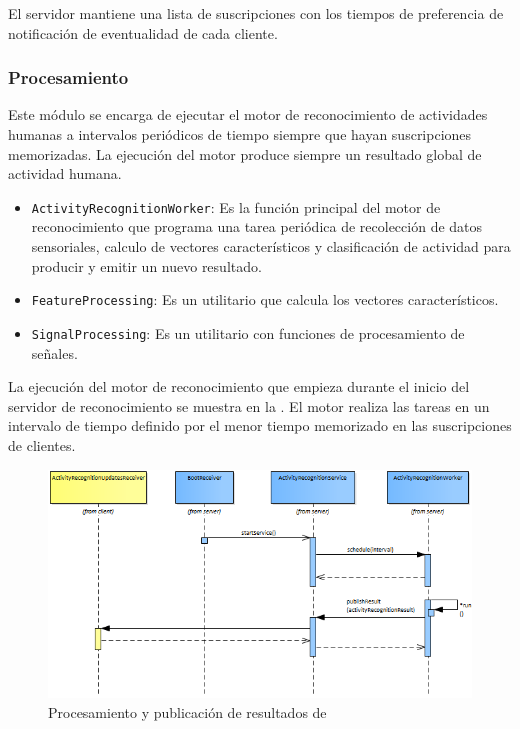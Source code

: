El servidor mantiene una lista de suscripciones con los tiempos de
preferencia de notificación de eventualidad de cada cliente. 

\subsubsection{Procesamiento}

Este módulo se encarga de ejecutar el motor de reconocimiento de actividades
humanas a intervalos periódicos de tiempo siempre que hayan suscripciones
memorizadas. La ejecución del motor produce siempre un resultado global
de actividad humana.
\begin{itemize}
\item \texttt{\small{}ActivityRecognitionWorker}: Es la función principal
del motor de reconocimiento que programa una tarea periódica de recolección
de datos sensoriales, calculo de vectores característicos y clasificación
de actividad para producir y emitir un nuevo resultado.
\item \texttt{\small{}FeatureProcessing}: Es un utilitario que calcula los
vectores característicos.
\item \texttt{\small{}SignalProcessing}: Es un utilitario con funciones
de procesamiento de señales. 
\end{itemize}
La ejecución del motor de reconocimiento que empieza durante el inicio
del servidor de reconocimiento se muestra en la .
El motor realiza las tareas en un intervalo de tiempo definido por
el menor tiempo memorizado en las suscripciones de clientes.

\begin{figure}[H]
\begin{centering}
\includegraphics[width=1\columnwidth]{capitulo-5/graphics/service_worker}
\par\end{centering}
\caption[Procesamiento y publicación de resultados de HARDroid]{\label{fig5:service-worker}Procesamiento y publicación de resultados
de }
\end{figure}

